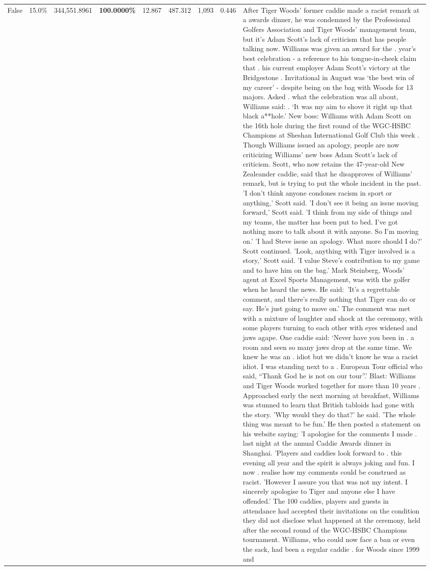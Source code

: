 \begin{table}[H]
\begin{tabular}{lllrlllll}
False & 15.0\% & 344,551.8961 & \bfseries \color{red} 100.0000\% & 12.867 & 487.312 & 1,093 & 0.446 & After Tiger Woods' former caddie made a racist remark at a awards dinner, he was condemned by the Professional Golfers Association and Tiger Woods' management team, but it's Adam Scott's lack of criticism that has people talking now. Williams was given an award for the . year’s best celebration - a reference to his tongue-in-cheek claim that . his current employer Adam Scott’s victory at the Bridgestone . Invitational in August was ‘the best win of my career’ - despite being on the bag with Woods for 13 majors. Asked . what the celebration was all about, Williams said: . ‘It was my aim to shove it right up that black a**hole.’ New boss: Williams with Adam Scott  on the 16th hole during the first round of the WGC-HSBC Champions at Sheshan International Golf Club this week . Though Williams issued an apology, people are now criticizing Williams' new boss Adam Scott's lack of criticism. Scott, who now retains the 47-year-old New Zealeander caddie, said that he disapproves of Williams' remark, but is trying to put the whole incident in the past. 'I don't think anyone condones racism in sport or anything,' Scott said. 'I don't see it being an issue moving forward,' Scott said. 'I think from my side of things and my teams, the matter has been put to bed. I've got nothing more to talk about it with anyone. So I'm moving on.' 'I had Steve issue an apology. What more should I do?' Scott continued. 'Look, anything with Tiger involved is a story,' Scott said. 'I value Steve's contribution to my game and to have him on the bag.' Mark Steinberg, Woods' agent at Excel Sports Management, was with the golfer when he heard the news. He said: 'It's a regrettable comment, and there's really nothing that Tiger can do or say. He's just going to move on.' The comment was met with a mixture of laughter and shock at the ceremony, with some players turning to each other with eyes widened and jaws agape. One caddie said: ‘Never have you been in . a room and seen so many jaws drop at the same time. We knew he was an . idiot but we didn’t know he was a racist idiot. I was standing next to a . European Tour official who said, “Thank God he is not on our tour”.’ Blast: Williams and Tiger Woods worked together for more than 10 years . Approached early the next morning at breakfast, Williams was stunned to learn that British tabloids had gone with the story. 'Why would they do that?' he said. 'The whole thing was meant to be fun.' He then posted a statement on his website saying: 'I apologise for the comments I made . last night at the annual Caddie Awards dinner in Shanghai. 'Players and caddies look forward to . this evening all year and the spirit is always joking and fun. I now . realise how my comments could be construed as racist. 'However I assure you that was not my intent. I sincerely apologise to Tiger and anyone else I have offended.' The 100 caddies, players and guests in attendance had accepted their invitations on the condition they did not disclose what happened at the ceremony, held after the second round of the WGC-HSBC Champions tournament. Williams, who could now face a ban or even the sack, had been a regular caddie . for Woods since 1999 and 
\end{tabular}
\end{table}
